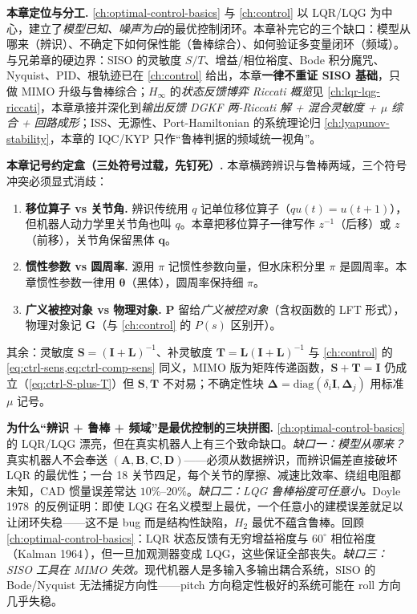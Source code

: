 \begin{note}
\textbf{本章定位与分工.}\;
\cref{ch:optimal-control-basics} 与 \cref{ch:control} 以 LQR/LQG 为中心，建立了\emph{模型已知、噪声为白}的最优控制闭环。本章补完它的三个缺口：模型从哪来（辨识）、不确定下如何保性能（鲁棒综合）、如何验证多变量闭环（频域）。与兄弟章的硬边界：SISO 的灵敏度 $S/T$、增益/相位裕度、Bode 积分魔咒、Nyquist、PID、根轨迹已在 \cref{ch:control} 给出，本章\textbf{一律不重证 SISO 基础}，只做 MIMO 升级与鲁棒综合；$H_\infty$ 的\emph{状态反馈博弈 Riccati 概览}见 \cref{ch:lqr-lqg-riccati}，本章承接并深化到\emph{输出反馈 DGKF 两-Riccati 解 + 混合灵敏度 + $\mu$ 综合 + 回路成形}；ISS、无源性、Port-Hamiltonian 的系统理论归 \cref{ch:lyapunov-stability}，本章的 IQC/KYP 只作“鲁棒判据的频域统一视角”。
\end{note}

\begin{note}
\textbf{本章记号约定盒（三处符号过载，先钉死）.}\;
本章横跨辨识与鲁棒两域，三个符号冲突必须显式消歧：
\begin{enumerate}
  \item \textbf{移位算子 vs 关节角.}\; 辨识传统用 $q$ 记单位移位算子（$qu(t)=u(t+1)$），但机器人动力学里关节角也叫 $q$。本章把移位算子一律写作 $z^{-1}$（后移）或 $z$（前移），关节角保留黑体 $\mathbf{q}$。
  \item \textbf{惯性参数 vs 圆周率.}\; 源用 $\pi$ 记惯性参数向量，但水床积分里 $\pi$ 是圆周率。本章惯性参数一律用 $\boldsymbol\theta$（黑体），圆周率保持细 $\pi$。
  \item \textbf{广义被控对象 vs 物理对象.}\; $\mathbf{P}$ 留给\emph{广义被控对象}（含权函数的 LFT 形式），物理对象记 $\mathbf{G}$（与 \cref{ch:control} 的 $P(s)$ 区别开）。
\end{enumerate}
其余：灵敏度 $\mathbf{S}=(\mathbf{I}+\mathbf{L})^{-1}$、补灵敏度 $\mathbf{T}=\mathbf{L}(\mathbf{I}+\mathbf{L})^{-1}$ 与 \cref{ch:control} 的 \cref{eq:ctrl-sens,eq:ctrl-comp-sens} 同义，MIMO 版为矩阵传递函数，$\mathbf{S}+\mathbf{T}=\mathbf{I}$ 仍成立（\cref{eq:ctrl-S-plus-T}）但 $\mathbf S,\mathbf T$ 不对易；不确定性块 $\boldsymbol\Delta=\mathrm{diag}(\delta_i\mathbf I,\boldsymbol\Delta_j)$ 用标准 $\mu$ 记号。
\end{note}

\noindent\textbf{为什么“辨识 + 鲁棒 + 频域”是最优控制的三块拼图.}\quad
\cref{ch:optimal-control-basics} 的 LQR/LQG 漂亮，但在真实机器人上有三个致命缺口。\emph{缺口一：模型从哪来？}真实机器人不会奉送 $(\mathbf A,\mathbf B,\mathbf C,\mathbf D)$——必须从数据辨识，而辨识偏差直接破坏 LQR 的最优性；一台 18 关节四足，每个关节的摩擦、减速比效率、绕组电阻都未知，CAD 惯量误差常达 $10\%$--$20\%$。\emph{缺口二：LQG 鲁棒裕度可任意小。}Doyle 1978\,\cite{doyle1978guaranteed} 的反例证明：即使 LQG 在名义模型上最优，一个任意小的建模误差就足以让闭环失稳——这不是 bug 而是结构性缺陷，$H_2$ 最优不蕴含鲁棒。回顾 \cref{ch:optimal-control-basics}：LQR 状态反馈有无穷增益裕度与 $60^\circ$ 相位裕度（Kalman 1964\,\cite{kalman1964optimal}），但一旦加观测器变成 LQG，这些保证全部丧失。\emph{缺口三：SISO 工具在 MIMO 失效。}现代机器人是多输入多输出耦合系统，SISO 的 Bode/Nyquist 无法捕捉方向性——pitch 方向稳定性极好的系统可能在 roll 方向几乎失稳。

